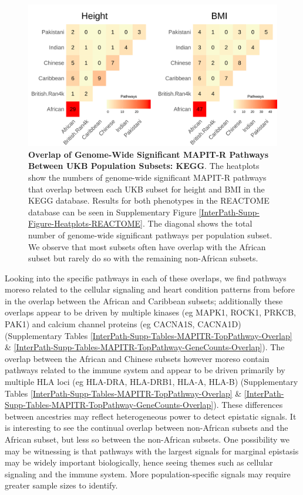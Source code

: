 \documentclass[12pt,a4paper]{article}
\begin{document}
\begin{figure}[htb]
\centering
\includegraphics[scale=.225]{Images/Main/InterPath_Main_Figure_Heatplots_KEGG_vs2.png}
\caption[TBD]{\textbf{Overlap of Genome-Wide Significant MAPIT-R Pathways Between UKB Population Subsets: KEGG}. The heatplots show the numbers of genome-wide significant MAPIT-R pathways that overlap between each UKB subset for height and BMI in the KEGG database. Results for both phenotypes in the REACTOME database can be seen in Supplementary Figure \ref{InterPath-Supp-Figure-Heatplots-REACTOME}. The diagonal shows the total number of genome-wide significant pathways per population subset. We observe that most subsets often have overlap with the African subset but rarely do so with the remaining non-African subsets.}
\label{InterPath-Main-Figure-Heatplots-KEGG}
\end{figure}

Looking into the specific pathways in each of these overlaps, we find pathways moreso related to the cellular signaling and heart condition patterns from before in the overlap between the African and Caribbean subsets; additionally these overlaps appear to be driven by multiple kinases (eg MAPK1, ROCK1, PRKCB, PAK1) and calcium channel proteins (eg CACNA1S, CACNA1D) (Supplementary Tables \ref{InterPath-Supp-Tables-MAPITR-TopPathway-Overlap} \& \ref{InterPath-Supp-Tables-MAPITR-TopPathway-GeneCounts-Overlap}). The overlap between the African and Chinese subsets however moreso contain pathways related to the immune system and appear to be driven primarily by multiple HLA loci (eg HLA-DRA, HLA-DRB1, HLA-A, HLA-B) (Supplementary Tables \ref{InterPath-Supp-Tables-MAPITR-TopPathway-Overlap} \& \ref{InterPath-Supp-Tables-MAPITR-TopPathway-GeneCounts-Overlap}). These differences between ancestries may reflect heterogeneous power to detect epistatic signals. It is interesting to see the continual overlap between non-African subsets and the African subset, but less so between the non-African subsets. One possibility we may be witnessing is that pathways with the largest signals for marginal epistasis may be widely important biologically, hence seeing themes such as cellular signaling and the immune system. More population-specific signals may require greater sample sizes to identify. 
\end{document}
